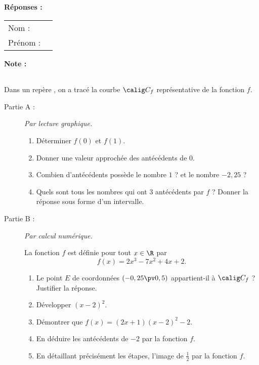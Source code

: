 \documentclass[10pt,french]{book}
\newcommand\presentation{
    \begin{tabular}{ll}
        Nom : \\[5pt]
        Prénom :
    \end{tabular}
\hfill
    \textbf{Note :}
        \renewcommand\arraystretch{2.3}
    \begin{tabular}{|c|}
        \hline
            \slashbox{\Huge\bfseries\phantom{10}}{\Huge\bfseries 10}\\
        \hline
    \end{tabular}
        \renewcommand\arraystretch{1.5}\par
    \vspace{1cm}
    \hrulefill
}
\begin{document}
\begin{landscape}
\begin{multicols}{2}
\columnbreak

\textbf{Réponses :}

\end{multicols}


\clearpage


\presentation

\begin{multicols}{2}
\small
Dans un repère \OIJ, on a tracé la courbe $\calig C_f$ représentative de la fonction $f$.\medskip


\begin{description}
    \item[Partie A :] \textit{Par lecture graphique.}
       \begin{enumerate}
            \item Déterminer $f(0)$ et $f(1)$.
            \item Donner une valeur approchée des antécédents de $0$.
            \item Combien d'antécédents possède le nombre $1$ ? et le nombre $-2,25$ ?
            \item Quels sont tous les nombres qui ont $3$ antécédents par $f$ ? Donner la réponse sous forme d'un intervalle.
        \end{enumerate}
    \item[Partie B :] \textit{Par calcul numérique.}\par
    La fonction $f$ est définie pour tout $x \in \R$ par \[f(x) = 2x^3 -7x^2 + 4x + 2.\]
        \begin{enumerate}
            \item Le point $E$ de coordonnées $(-0,25 \pv 0,5)$ appartient-il à $\calig C_f$ ? Justifier la réponse.
            \item Développer $(x - 2)^2$.
            \item Démontrer que $f(x) = (2x+1)(x-2)^2-2$.
            \item En déduire les antécédents de $-2$ par la fonction $f$.
            \item En détaillant précisément les étapes, l'image de $\frac{1}{2}$ par la fonction $f$.
        \end{enumerate}
\end{description}


\end{multicols}
\end{landscape}
\end{document}
